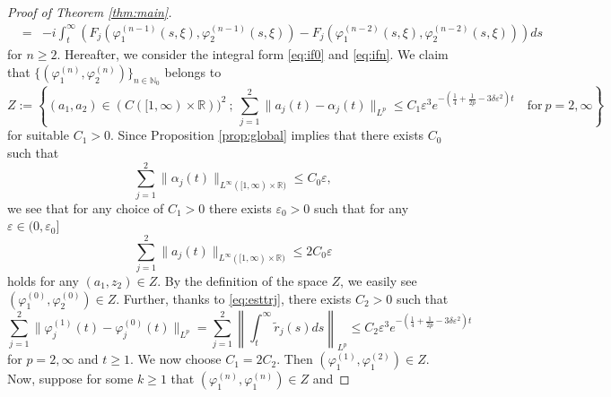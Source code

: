 \documentclass[11pt,a4paper,twosides]{amsart}
\theoremstyle{plain}
\theoremstyle{remark}
\numberwithin{equation}{section}
\newcommand{\R}{\mathbb{R}}
\newcommand{\N}{\mathbb{N}}
\def\le{\leqslant}
\def\ge{\geqslant}
\theoremstyle{definition}
\newcommand{\1}{{\bf 1}_{\{|x| < |t|\}}}
\renewcommand{\phi}{\varphi}
\renewcommand{\epsilon}{\varepsilon}
\renewcommand{\tilde}{\widetilde}
\begin{document}
\begin{proof}[Proof of Theorem \ref{thm:main}]
\begin{eqnarray}
    &=&-i \int_t^\infty\left(F_j(\phi_1^{(n-1)}(s,\xi), \phi_2^{(n-1)}(s,\xi))
    - F_j(\phi_1^{(n-2)}(s,\xi), \phi_2^{(n-2)}(s,\xi))\right)ds
    \nonumber
  \end{eqnarray}
  for $n \ge 2$.
  Hereafter, we consider the integral form \eqref{eq:if0} and \eqref{eq:ifn}.
  We claim that $\{(\phi_1^{(n)}, \phi_2^{(n)})\}_{n \in \N_0}$ belongs to
   \begin{equation}
    Z := \left\{(a_1, a_2) \in (C([1,\infty)\times \R))^2\ ;\
    \sum_{j=1}^2 \|a_j(t) - \alpha_j(t)\|_{L^p} 
       \le C_1\epsilon^3e^{-(\frac14+\frac{1}{2p}-3\delta\epsilon^2)t} 
       \quad\text{for}\ p=2,\infty
    \right\}
  \end{equation}
  for suitable $C_1>0$. Since Proposition \ref{prop:global} implies that there exists $C_0$ such that
  \begin{equation}
    \sum_{j=1}^2\|\alpha_j(t)\|_{L^\infty([1,\infty)\times\R)} \le C_0\epsilon,
  \end{equation}
  we see that for any choice of $C_1 > 0$ there exists $\epsilon_0 > 0$ such that for any $\epsilon \in (0,\epsilon_0]$
  \begin{equation}
    \sum_{j=1}^2\|a_j(t)\|_{L^\infty([1,\infty)\times\R)} \le 2C_0\epsilon
  \end{equation}
  holds for any $(a_1, z_2) \in Z$.
  By the definition of the space $Z$, 
  we easily see $(\phi_1^{(0)}, \phi_2^{(0)}) \in Z$. 
  Further, thanks to \eqref{eq:esttrj}, there exists $C_2 > 0$ such that
  \begin{equation}
    \sum_{j=1}^2\|\phi_j^{(1)}(t) - \phi_j^{(0)}(t)\|_{L^p}
    = \sum_{j=1}^2\left\|\int_t^\infty\tilde{r}_j(s)ds\right\|_{L^p}
    \le C_2\epsilon^3e^{-(\frac14 + \frac{1}{2p}-3\delta\epsilon^2)t}
  \end{equation}
  for $p = 2, \infty$ and $t \ge 1$.
  We now choose $C_1 = 2C_2$. Then $(\phi^{(1)}_1, \phi^{(2)}_1) \in Z$.
  Now, suppose for some $k \ge 1$ that $(\phi^{(n)}_1, \phi^{(n)}_1) \in Z$ and

\end{proof}
\end{document}
